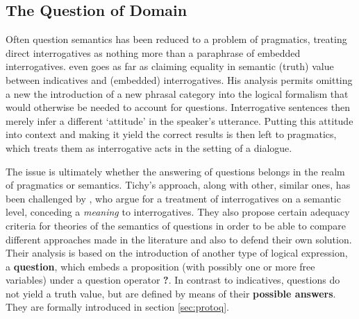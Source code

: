 \documentclass[notitlepage,twoside,a4paper]{scrreprt}
\newcommand{\term}[1]{\textsf{\textbf{#1}}} %
\newenvironment{quotes}{\begin{quote}\sf}{\rm\end{quote}}
\theoremstyle{remark}
\theoremstyle{remark}
\theoremstyle{definition}
\theoremstyle{definition}
\begin{document}
\subsection{The Question of Domain}

Often question semantics has been reduced to a problem of pragmatics, treating
direct interrogatives as nothing more than a paraphrase of embedded
interrogatives.\cite{tichy} even goes as far as claiming equality in semantic
(truth) value between indicatives and (embedded) interrogatives. His analysis
permits omitting a new the introduction of a new phrasal category into the
logical formalism that would otherwise be needed to account for questions.
Interrogative sentences then merely infer a different `attitude' in the
speaker's utterance. Putting this attitude into context and making it yield the
correct results is then left to pragmatics, which treats them as interrogative
acts in the setting of a dialogue.

The issue is ultimately whether the answering of questions belongs in the realm
of pragmatics or semantics. Tichy's approach, along with other, similar ones,
has been challenged by \cite{gs:q}, who argue for a treatment of interrogatives
on a semantic level, conceding a \emph{meaning} to interrogatives.  They also
propose certain adequacy criteria for theories of the semantics of questions in
order to be able to compare different approaches made in the literature and also
to defend their own solution. Their analysis is based on the introduction of
another type of logical expression, a \term{question}, which embeds a
proposition (with possibly one or more free variables) under a question operator
\term{?}.  In contrast to indicatives, questions do not yield a truth value, but
are defined by means of their \term{possible answers}.  They are formally
introduced in section \ref{sec:protoq}.


\end{document}
